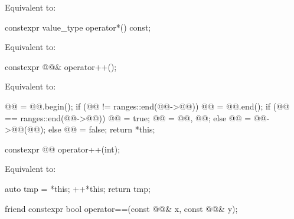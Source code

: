 \begin{itemdescr}
\pnum
\effects
Equivalent to: 
\end{itemdescr}

%
\begin{itemdecl}
constexpr value_type operator*() const;
\end{itemdecl}

\begin{itemdescr}
\pnum
\effects
Equivalent to: 
\end{itemdescr}

%
\begin{itemdecl}
constexpr @@& operator++();
\end{itemdecl}

\begin{itemdescr}
\pnum
\effects
Equivalent to:
\begin{codeblock}
@@ = @@.begin();
if (@@ != ranges::end(@@->@@)) {
  @@ = @@.end();
  if (@@ == ranges::end(@@->@@)) {
    @@ = true;
    @@ = {@@, @@};
  } else {
    @@ = @@->@@(@@);
  }
} else {
  @@ = false;
}
return *this;
\end{codeblock}
\end{itemdescr}

%
\begin{itemdecl}
constexpr @@ operator++(int);
\end{itemdecl}

\begin{itemdescr}
\pnum
\effects
Equivalent to:
\begin{codeblock}
auto tmp = *this;
++*this;
return tmp;
\end{codeblock}
\end{itemdescr}

%
\begin{itemdecl}
friend constexpr bool operator==(const @@& x, const @@& y);
\end{itemdecl}

